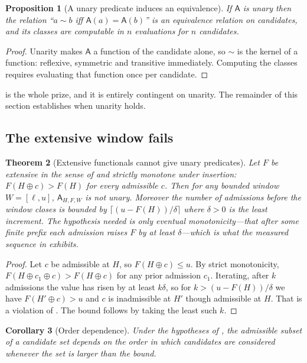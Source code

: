 \documentclass[11pt,twocolumn,a4paper]{article}
\theoremstyle{upthm}
\newtheorem{theorem}{Theorem}[section]
\newtheorem{proposition}[theorem]{Proposition}
\newtheorem{corollary}[theorem]{Corollary}
\theoremstyle{definition}
\theoremstyle{remark}
\newcommand{\adm}{\mathsf{A}}
\begin{document}
\begin{proposition}[A unary predicate induces an equivalence]
\label{prop:equiv}
If $\adm$ is unary then the relation ``$a\sim b$ iff $\adm(a)=\adm(b)$''
is an equivalence relation on candidates, and its classes are computable
in $n$ evaluations for $n$ candidates.
\end{proposition}

\begin{proof}
Unarity makes $\adm$ a function of the candidate alone, so $\sim$ is the
kernel of a function: reflexive, symmetric and transitive immediately.
Computing the classes requires evaluating that function once per
candidate.
\end{proof}

 is the whole prize, and it is entirely contingent on
unarity. The remainder of this section establishes when unarity holds.

\subsection{The extensive window fails}

\begin{theorem}[Extensive functionals cannot give unary predicates]
\label{thm:extensive-fails}
Let $F$ be extensive in the sense of  and strictly
monotone under insertion: $F(H\oplus c)>F(H)$ for every admissible $c$.
Then for any bounded window $W=[\ell,u]$, $\adm_{H,F,W}$ is not unary.
Moreover the number of admissions before the window closes is bounded by
$\lceil (u-F(H))/\delta\rceil$ where $\delta>0$ is the least increment.
The hypothesis needed is only \emph{eventual} monotonicity---that after
some finite prefix each admission raises $F$ by at least $\delta$---which
is what the measured sequence in  exhibits.
\end{theorem}

\begin{proof}
Let $c$ be admissible at $H$, so $F(H\oplus c)\le u$. By strict
monotonicity, $F(H\oplus c_1\oplus c)>F(H\oplus c)$ for any prior
admission $c_1$. Iterating, after $k$ admissions the value has risen by
at least $k\delta$, so for $k>(u-F(H))/\delta$ we have
$F(H'\oplus c)>u$ and $c$ is inadmissible at $H'$ though admissible at
$H$. That is a violation of . The bound follows by
taking the least such $k$.
\end{proof}

\begin{corollary}[Order dependence]
\label{cor:order}
Under the hypotheses of , the admissible subset
of a candidate set depends on the order in which candidates are
considered whenever the set is larger than the bound.
\end{corollary}
\end{document}
